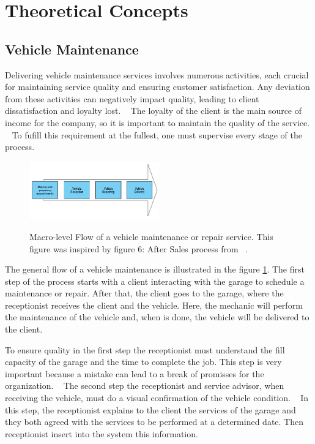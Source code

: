 \section{Theoretical Concepts}

\subsection{Vehicle Maintenance}

Delivering vehicle maintenance services involves numerous activities, each crucial for maintaining service quality and ensuring customer satisfaction. 
Any deviation from these activities can negatively impact quality, leading to client dissatisfaction and loyalty lost. ~\cite{Setting_the_after_sale_process}
The loyalty of the client is the main source of income for the company, so it is important to maintain the quality of the service. ~\cite{Setting_the_after_sale_process}
To fufill this requirement at the fullest, one must supervise every stage of the process. ~\cite{Setting_the_after_sale_process}


\begin{figure}[h]
  \caption{Macro-level Flow of a vehicle maintenance or repair service. This figure was inspired by figure 6: After Sales process from ~\citet{Setting_the_after_sale_process}.}
  \centering
  \includegraphics[width=0.50\textwidth]{figs/Vehicle_maintenace_macro}
  \label{fig:Vehicle_maintenace_macro}
\end{figure}

The general flow of a vehicle maintenance is illustrated in the figure \ref{fig:Vehicle_maintenace_macro}. 
The first step of the process starts with a client interacting with the garage to schedule a maintenance or repair. 
After that, the client goes to the garage, where the receptionist receives the client and the vehicle.
Here, the mechanic will perform the maintenance of the vehicle and, when is done, the vehicle will be delivered to the client.

To ensure quality in the first step the receptionist must understand the fill capacity of the garage and the time to complete the job. 
This step is very important because a mistake can lead to a break of promisses for the organization. ~\cite{Setting_the_after_sale_process}
The second step the receptionist and service advisor, when receiving the vehicle, must do a visual confirmation of the vehicle condition. ~\cite{Setting_the_after_sale_process}
In this step, the receptionist explains to the client the services of the garage and they both agreed with the services to be performed at a determined date. 
Then receptionist insert into the system this information. ~\cite{Setting_the_after_sale_process}

